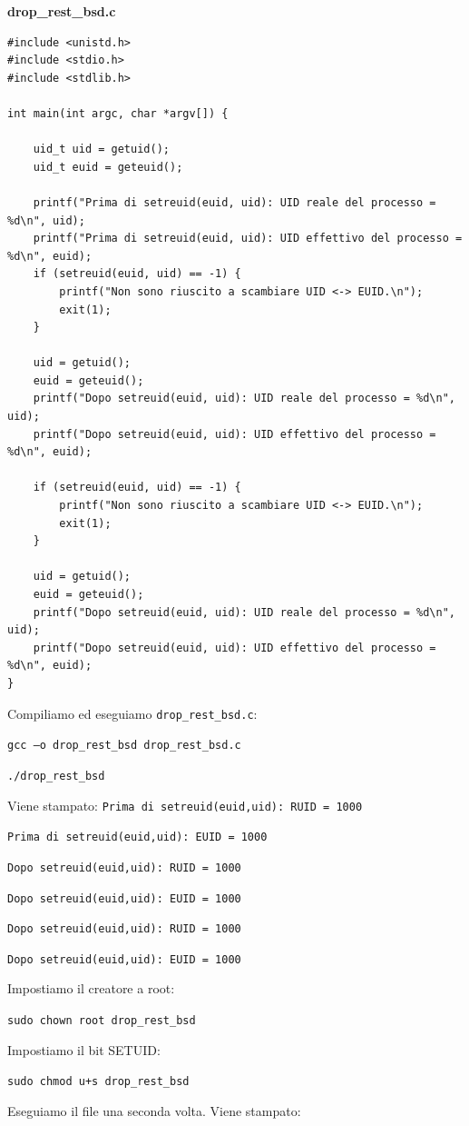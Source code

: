 \begin{mdframed}[backgroundcolor=white!20,shadow=false]
\textbf{drop\_rest\_bsd.c}
\begin{verbatim}
#include <unistd.h>
#include <stdio.h>
#include <stdlib.h>

int main(int argc, char *argv[]) {

	uid_t uid = getuid();
	uid_t euid = geteuid();

	printf("Prima di setreuid(euid, uid): UID reale del processo = %d\n", uid);
	printf("Prima di setreuid(euid, uid): UID effettivo del processo = %d\n", euid);
	if (setreuid(euid, uid) == -1) {
		printf("Non sono riuscito a scambiare UID <-> EUID.\n");
		exit(1);
	}

	uid = getuid();
	euid = geteuid();
	printf("Dopo setreuid(euid, uid): UID reale del processo = %d\n", uid);
	printf("Dopo setreuid(euid, uid): UID effettivo del processo = %d\n", euid);

	if (setreuid(euid, uid) == -1) {
		printf("Non sono riuscito a scambiare UID <-> EUID.\n");
		exit(1);
	}

	uid = getuid();
	euid = geteuid();
	printf("Dopo setreuid(euid, uid): UID reale del processo = %d\n", uid);
	printf("Dopo setreuid(euid, uid): UID effettivo del processo = %d\n", euid);
}

\end{verbatim}
\end{mdframed}
Compiliamo ed eseguiamo \texttt{drop\_rest\_bsd.c}:
\begin{center}
    \texttt{gcc –o drop\_rest\_bsd drop\_rest\_bsd.c}
    
    \texttt{./drop\_rest\_bsd}
\end{center}
Viene stampato:
\texttt{Prima di setreuid(euid,uid): RUID = 1000}

\texttt{Prima di setreuid(euid,uid): EUID = 1000}

\texttt{Dopo setreuid(euid,uid): RUID = 1000 }

\texttt{Dopo setreuid(euid,uid): EUID = 1000}

\texttt{Dopo setreuid(euid,uid): RUID = 1000 }

\texttt{Dopo setreuid(euid,uid): EUID = 1000}

Impostiamo il creatore a root:
\begin{center}
    \texttt{sudo chown root drop\_rest\_bsd}
\end{center}
Impostiamo il bit SETUID:
\begin{center}
    \texttt{sudo chmod u+s drop\_rest\_bsd
}
\end{center}
Eseguiamo il file una seconda volta. Viene stampato:

